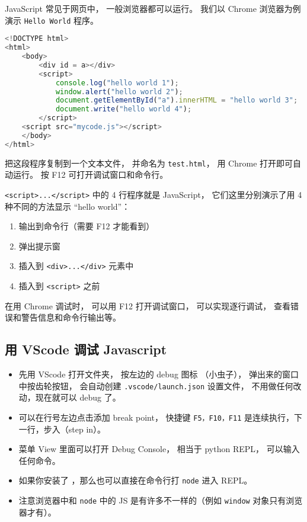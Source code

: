 
JavaScript 常见于网页中， 一般浏览器都可以运行。 我们以 Chrome 浏览器为例演示 \verb`Hello World` 程序。

\begin{lstlisting}[language=js]
<!DOCTYPE html>
<html>
	<body>
		<div id = a></div>
		<script>
            console.log("hello world 1");
            window.alert("hello world 2");
			document.getElementById("a").innerHTML = "hello world 3";
            document.write("hello world 4");
		</script>
    <script src="mycode.js"></script>
	</body>
</html>
\end{lstlisting}
把这段程序复制到一个文本文件， 并命名为 \verb`test.html`， 用 Chrome 打开即可自动运行。 按 F12 可打开调试窗口和命令行。

\verb`<script>...</script>` 中的 4 行程序就是 JavaScript， 它们这里分别演示了用 4 种不同的方法显示 “hello world”：
\begin{enumerate}
\item 输出到命令行（需要 F12 才能看到）
\item 弹出提示窗
\item 插入到 \verb`<div>...</div>` 元素中
\item 插入到 \verb`<script>` 之前
\end{enumerate}

在用 Chrome 调试时， 可以用 F12 打开调试窗口， 可以实现逐行调试， 查看错误和警告信息和命令行输出等。

\subsection{用 VScode 调试 Javascript}
\begin{itemize}
\item 先用 VScode 打开文件夹， 按左边的 debug 图标 （小虫子）， 弹出来的窗口中按齿轮按钮， 会自动创建 \verb`.vscode/launch.json` 设置文件， 不用做任何改动，现在就可以 debug 了。
\item 可以在行号左边点击添加 break point， 快捷键 \verb`F5，F10，F11` 是连续执行，下一行，步入（step in）。
\item 菜单 View 里面可以打开 Debug Console， 相当于 python REPL， 可以输入任何命令。
\item 如果你安装了 ，那么也可以直接在命令行打 \verb`node` 进入 REPL。
\item 注意浏览器中和 \verb`node` 中的 JS 是有许多不一样的（例如 \verb`window` 对象只有浏览器才有）。
\end{itemize}

